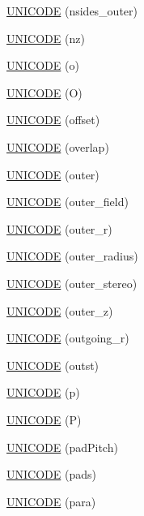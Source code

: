 \begin{DoxyCompactItemize}
\item 
\hyperlink{namespace_d_d4hep_1_1_x_m_l_afe56da53a380b4c3d1581c8cad42c1e8}{UNICODE} (nsides\_\-outer)
\item 
\hyperlink{namespace_d_d4hep_1_1_x_m_l_ae25113385c091c6e5b882b0f358e52b0}{UNICODE} (nz)
\item 
\hyperlink{namespace_d_d4hep_1_1_x_m_l_a6e8618bf5d116c07d06cdb0f816f7ca0}{UNICODE} (o)
\item 
\hyperlink{namespace_d_d4hep_1_1_x_m_l_a525d1e19c48707481dbdf9d15a8562ee}{UNICODE} (O)
\item 
\hyperlink{namespace_d_d4hep_1_1_x_m_l_a634563af6b0ca4a9316ce60761501c3a}{UNICODE} (offset)
\item 
\hyperlink{namespace_d_d4hep_1_1_x_m_l_a03f4950576efa9ff83da27b945a84be5}{UNICODE} (overlap)
\item 
\hyperlink{namespace_d_d4hep_1_1_x_m_l_a971dd22e4691235c19b85cf9537686bb}{UNICODE} (outer)
\item 
\hyperlink{namespace_d_d4hep_1_1_x_m_l_a0a1bd670ca2912fd4d4e058abf4189f9}{UNICODE} (outer\_\-field)
\item 
\hyperlink{namespace_d_d4hep_1_1_x_m_l_aa949484cb3a6b414bc108e60cc01c9f7}{UNICODE} (outer\_\-r)
\item 
\hyperlink{namespace_d_d4hep_1_1_x_m_l_a24bda70c8cbf79860b98983e04cab6dd}{UNICODE} (outer\_\-radius)
\item 
\hyperlink{namespace_d_d4hep_1_1_x_m_l_a525f127cfb32b5f94ec544b46bda9d4c}{UNICODE} (outer\_\-stereo)
\item 
\hyperlink{namespace_d_d4hep_1_1_x_m_l_a5f682a2de9b110210df453f08d47e837}{UNICODE} (outer\_\-z)
\item 
\hyperlink{namespace_d_d4hep_1_1_x_m_l_a6e18cafe69c82b1e89e95f3c03dfe802}{UNICODE} (outgoing\_\-r)
\item 
\hyperlink{namespace_d_d4hep_1_1_x_m_l_a5c6ed695805ba9dbf0c0ff052543229b}{UNICODE} (outst)
\item 
\hyperlink{namespace_d_d4hep_1_1_x_m_l_a10c48be81b4e62ddd7f5fc7d4c6665f1}{UNICODE} (p)
\item 
\hyperlink{namespace_d_d4hep_1_1_x_m_l_a3b67f220a60d1ee7471909c199442706}{UNICODE} (P)
\item 
\hyperlink{namespace_d_d4hep_1_1_x_m_l_ad8a9fe5104d0b40b6fd0146c24592b5f}{UNICODE} (padPitch)
\item 
\hyperlink{namespace_d_d4hep_1_1_x_m_l_a954bcd789e301364b28540328241ec42}{UNICODE} (pads)
\item 
\hyperlink{namespace_d_d4hep_1_1_x_m_l_ad44f061bd695ec4771aa9ebd79016164}{UNICODE} (para)

\end{DoxyCompactItemize}

